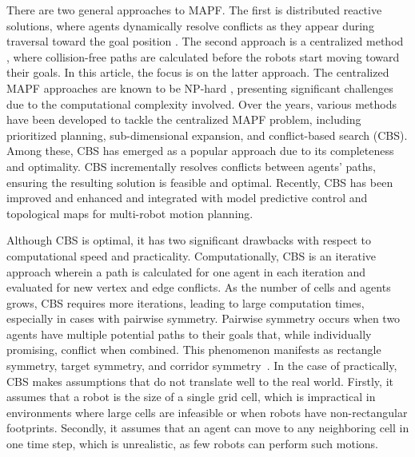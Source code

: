 \documentclass[letterpaper, 10 pt, conference]{ieeeconf}  %
\begin{document}
There are two general approaches to MAPF. The first is distributed reactive solutions, where agents dynamically resolve conflicts as they appear during traversal toward the goal position \cite{ma2021distributed, lafmejani2021nonlinear, park2023dlsc, Multi_agent_Niklas}. The second approach is a centralized method \cite{standley2010finding}, where collision-free paths are calculated before the robots start moving toward their goals. In this article, the focus is on the latter approach. The centralized MAPF approaches are known to be NP-hard \cite{yu2015optimal}, presenting significant challenges due to the computational complexity involved. Over the years, various methods have been developed to tackle the centralized MAPF problem, including prioritized planning\cite{ma2019searching}, sub-dimensional expansion\cite{wagner2015subdimensional}, and conflict-based search (CBS)\cite{sharon2015conflict}. Among these, CBS has emerged as a popular approach due to its completeness and optimality\cite{sharon2015conflict}. CBS incrementally resolves conflicts between agents' paths, ensuring the resulting solution is feasible and optimal. Recently, CBS has been improved and enhanced\cite{boyarski2015icbs, gange2019lazy} and integrated with model predictive control\cite{via2020efficient, tajbakhsh2024conflict} and topological maps\cite{mcbeth2023scalable} for multi-robot motion planning.

Although CBS is optimal, it has two significant drawbacks with respect to computational speed and practicality. Computationally, 
CBS is an iterative approach wherein a path is calculated for one agent in each iteration and evaluated for new vertex and edge conflicts. As the number of cells and agents grows, CBS requires more iterations, leading to large computation times, especially in cases with pairwise symmetry. Pairwise symmetry occurs when two agents have multiple potential paths to their goals that, while individually promising, conflict when combined. This phenomenon manifests as rectangle symmetry, target symmetry, and corridor symmetry~\cite{li2019symmetry,li2021pairwise}.
In the case of practically, CBS makes assumptions that do not translate well to the real world. Firstly, it assumes that a robot is the size of a single grid cell, which is impractical in environments where large cells are infeasible or when robots have non-rectangular footprints. Secondly, it assumes that an agent can move to any neighboring cell in one time step, which is unrealistic, as few robots can perform such motions.
\end{document}

